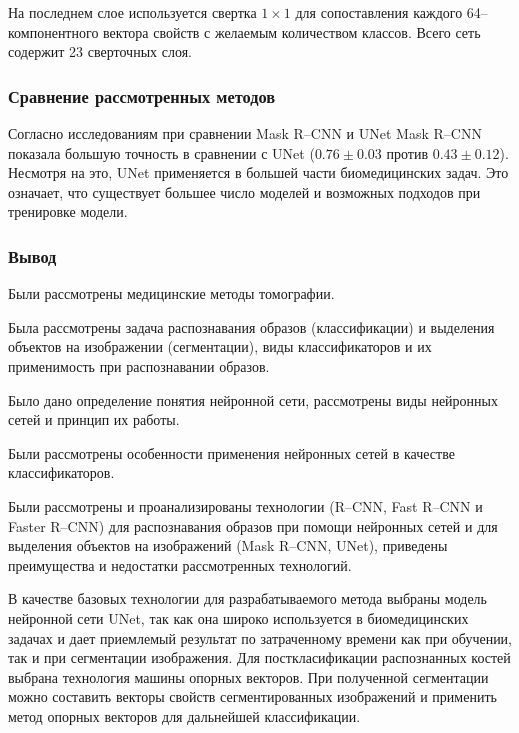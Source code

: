 На последнем слое используется свертка $1 \times 1$ для сопоставления каждого 64--компонентного вектора свойств с желаемым количеством классов. Всего сеть содержит 23 сверточных слоя.

\subsubsection{Сравнение рассмотренных методов}

Согласно исследованиям \cite{segcomp} при сравнении Mask R--CNN и UNet Mask R--CNN показала большую точность в сравнении с UNet ($0.76 \pm 0.03$ против $0.43 \pm 0.12$). Несмотря на это, UNet применяется в большей части биомедицинских задач. Это означает, что существует большее число моделей и возможных подходов при тренировке модели.

\subsubsection*{Вывод}

Были рассмотрены медицинские методы томографии.

Была рассмотрены задача распознавания образов (классификации) и выделения объектов на изображении (сегментации), виды классификаторов и их применимость при распознавании образов.

Было дано определение понятия нейронной сети, рассмотрены виды нейронных сетей и принцип их работы.

Были рассмотрены особенности применения нейронных сетей в качестве классификаторов.

Были рассмотрены и проанализированы технологии (R--CNN, Fast R--CNN и Faster R--CNN) для распознавания образов при помощи нейронных сетей и для выделения объектов на изображений (Mask R--CNN, UNet), приведены преимущества и недостатки рассмотренных технологий.

В качестве базовых технологии для разрабатываемого метода выбраны модель нейронной сети UNet, так как она широко используется в биомедицинских задачах и дает приемлемый результат по затраченному времени как при обучении, так и при сегментации изображения. Для посткласификации распознанных костей выбрана технология машины опорных векторов. При полученной сегментации можно составить векторы свойств сегментированных изображений и применить метод опорных векторов для дальнейшей классификации.